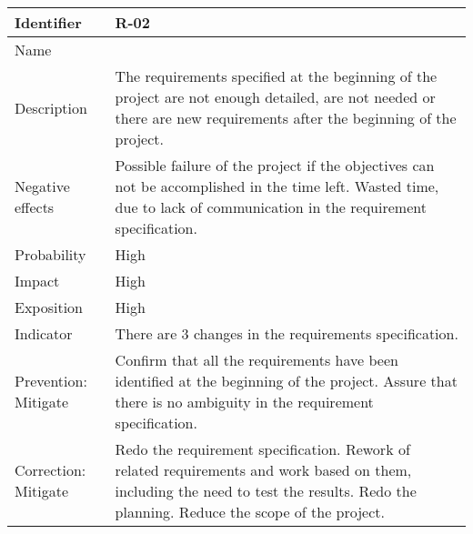 \begin{table}[H]
	\begin{tabularx}{\textwidth}{|y|z|}
		\hline
		Identifier & \textbf{R-02} \\ \hline
		Name & \Rdos \\ \hline
		Description &
			The requirements specified at the beginning of the project are not enough detailed, are not needed or there are new requirements after the beginning of the project.
		\\ \hline
		Negative effects &
			Possible failure of the project if the objectives can not be accomplished in the time left. \linej
			Wasted time, due to lack of communication in the requirement specification.
		\\ \hline
		Probability & High\\ \hline
		Impact &  High\\ \hline
		Exposition &  High\\ \hline
		Indicator & There are 3 changes in the requirements specification.\\ \hline
		Prevention: Mitigate &
			Confirm that all the requirements have been identified at the beginning of the project.\linej
			Assure that there is no ambiguity in the requirement specification.
		\\ \hline
		Correction: Mitigate &
			Redo the requirement specification. \linej
			Rework of related requirements and work based on them, including the need to test the results. \linej
			Redo the planning.  \linej
			Reduce the scope of the project.
		\\ \hline
	\end{tabularx}
\end{table}


